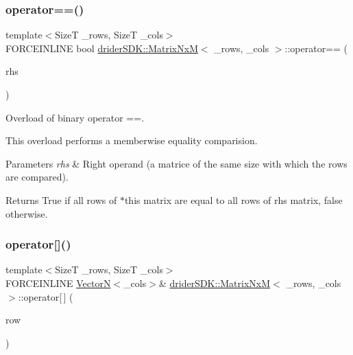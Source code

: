 \subsubsection{\texorpdfstring{operator==()}{operator==()}}
{\footnotesize\ttfamily template$<$SizeT \+\_\+rows, SizeT \+\_\+cols$>$ \\
F\+O\+R\+C\+E\+I\+N\+L\+I\+NE bool \hyperlink{classdrider_s_d_k_1_1_matrix_nx_m}{drider\+S\+D\+K\+::\+Matrix\+NxM}$<$ \+\_\+rows, \+\_\+cols $>$\+::operator== (\begin{DoxyParamCaption}\item[{const \hyperlink{classdrider_s_d_k_1_1_matrix_nx_m}{Matrix\+NxM}$<$ \+\_\+rows, \+\_\+cols $>$ \&}]{rhs }\end{DoxyParamCaption})\hspace{0.3cm}{\ttfamily [inline]}}

Overload of binary operator ==.

This overload performs a memberwise equality comparision.


\begin{DoxyParams}{Parameters}
{\em rhs} & Right operand (a matrice of the same size with which the rows are compared).\\
\hline
\end{DoxyParams}
\begin{DoxyReturn}{Returns}
True if all rows of $\ast$this matrix are equal to all rows of rhs matrix, false otherwise. 
\end{DoxyReturn}
\mbox{\label{classdrider_s_d_k_1_1_matrix_nx_m_a4aaf18e9a3b4a1dda70b55c791de7b88}} 
\subsubsection{\texorpdfstring{operator[]()}{operator[]()}\hspace{0.1cm}{\footnotesize\ttfamily [1/2]}}
{\footnotesize\ttfamily template$<$SizeT \+\_\+rows, SizeT \+\_\+cols$>$ \\
F\+O\+R\+C\+E\+I\+N\+L\+I\+NE \hyperlink{classdrider_s_d_k_1_1_vector_n}{VectorN}$<$\+\_\+cols$>$\& \hyperlink{classdrider_s_d_k_1_1_matrix_nx_m}{drider\+S\+D\+K\+::\+Matrix\+NxM}$<$ \+\_\+rows, \+\_\+cols $>$\+::operator\mbox{[}$\,$\mbox{]} (\begin{DoxyParamCaption}\item[{SizeT}]{row }\end{DoxyParamCaption})\hspace{0.3cm}{\ttfamily [inline]}}

